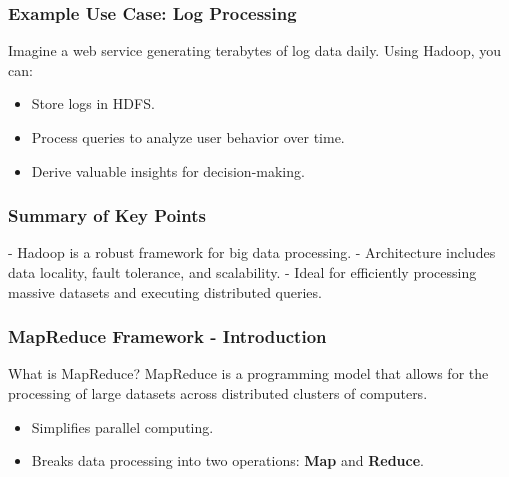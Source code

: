 \documentclass[aspectratio=169]{beamer}
\begin{document}
\begin{frame}[fragile]
    \frametitle{Example Use Case: Log Processing}
    Imagine a web service generating terabytes of log data daily. Using Hadoop, you can:
    \begin{itemize}
        \item Store logs in HDFS.
        \item Process queries to analyze user behavior over time.
        \item Derive valuable insights for decision-making.
    \end{itemize}
\end{frame}

\begin{frame}[fragile]
    \frametitle{Summary of Key Points}
    - Hadoop is a robust framework for big data processing.
    - Architecture includes data locality, fault tolerance, and scalability.
    - Ideal for efficiently processing massive datasets and executing distributed queries.
\end{frame}

\begin{frame}
    \frametitle{MapReduce Framework - Introduction}
    \begin{block}{What is MapReduce?}
        MapReduce is a programming model that allows for the processing of large datasets across distributed clusters of computers.
    \end{block}
    \begin{itemize}
        \item Simplifies parallel computing.
        \item Breaks data processing into two operations: \textbf{Map} and \textbf{Reduce}.
    \end{itemize}
\end{frame}
\end{document}
